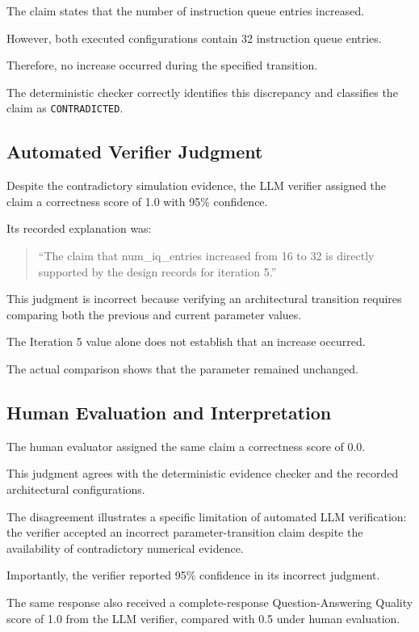 The claim states that the
number of instruction queue
entries increased.

However, both executed
configurations contain
32 instruction queue entries.

Therefore, no increase
occurred during the
specified transition.

The deterministic checker
correctly identifies this
discrepancy and classifies
the claim as
\texttt{CONTRADICTED}.

\subsection{Automated Verifier Judgment}

Despite the contradictory
simulation evidence,
the LLM verifier assigned
the claim a correctness
score of 1.0 with
95\% confidence.

Its recorded explanation was:

\begin{quote}
``The claim that num\_iq\_entries
increased from 16 to 32 is directly
supported by the design records
for iteration 5.''
\end{quote}

This judgment is incorrect
because verifying an
architectural transition
requires comparing both
the previous and current
parameter values.

The Iteration 5 value
alone does not establish
that an increase occurred.

The actual comparison
shows that the parameter
remained unchanged.

\subsection{Human Evaluation and Interpretation}

The human evaluator assigned
the same claim a correctness
score of 0.0.

This judgment agrees with
the deterministic evidence
checker and the recorded
architectural configurations.

The disagreement illustrates
a specific limitation of
automated LLM verification:
the verifier accepted an
incorrect parameter-transition
claim despite the availability
of contradictory numerical
evidence.

Importantly, the verifier
reported 95\% confidence
in its incorrect judgment.

The same response also
received a complete-response
Question-Answering Quality
score of 1.0 from the
LLM verifier, compared
with 0.5 under human
evaluation.

